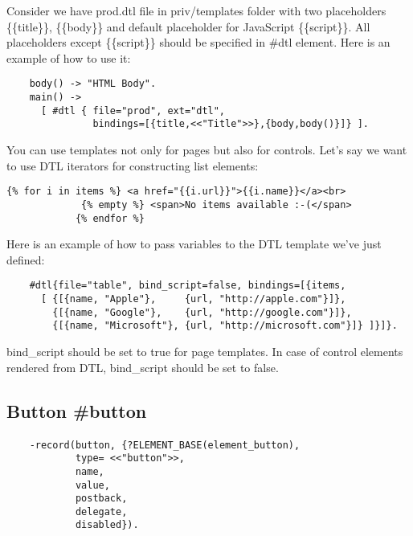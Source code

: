 Consider we have prod.dtl file in priv/templates folder with two
placeholders \{\{title\}\}, \{\{body\}\} and default placeholder for JavaScript \{\{script\}\}.
All placeholders except \{\{script\}\} should be specified in \#dtl element.
Here is an example of how to use it:

\vspace{1\baselineskip}
\begin{lstlisting}
    body() -> "HTML Body".
    main() ->
      [ #dtl { file="prod", ext="dtl",
               bindings=[{title,<<"Title">>},{body,body()}]} ].
\end{lstlisting}
\vspace{1\baselineskip}

You can use templates not only for pages but also for controls. Let's say we want
to use DTL iterators for constructing list elements:

\vspace{1\baselineskip}
\begin{lstlisting}[caption=table.html]
    {% for i in items %} <a href="{{i.url}}">{{i.name}}</a><br>
             {% empty %} <span>No items available :-(</span>
            {% endfor %}
\end{lstlisting}
\vspace{1\baselineskip}

Here is an example of how to pass variables to the DTL template we've just defined:

\vspace{1\baselineskip}
\begin{lstlisting}
    #dtl{file="table", bind_script=false, bindings=[{items,
      [ {[{name, "Apple"},     {url, "http://apple.com"}]},
        {[{name, "Google"},    {url, "http://google.com"}]},
        {[{name, "Microsoft"}, {url, "http://microsoft.com"}]} ]}]}.
\end{lstlisting}
\vspace{1\baselineskip}

bind\_script should be set to true for page templates. In case of control elements rendered from DTL,
bind\_script should be set to false.

\subsection{Button {\bf \#button}}

\paragraph{}
\begin{lstlisting}
    -record(button, {?ELEMENT_BASE(element_button),
            type= <<"button">>,
            name,
            value,
            postback,
            delegate,
            disabled}).
\end{lstlisting}

